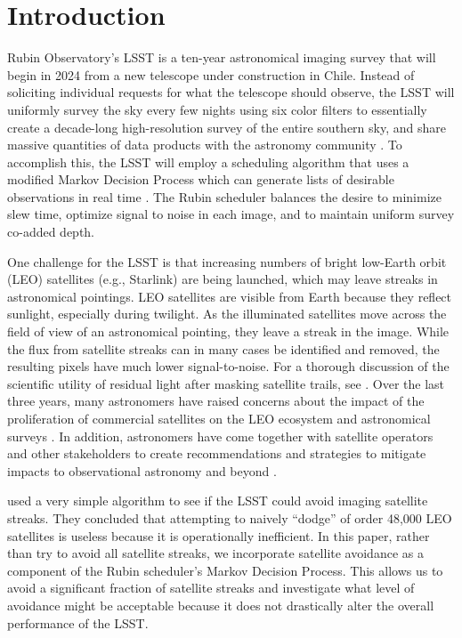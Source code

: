 \documentclass[twocolumn]{aastex631}
\begin{document}
\section{Introduction} \label{sec:intro}

Rubin Observatory's LSST is a ten-year astronomical imaging survey that will begin in 2024 from a new telescope under construction in Chile. Instead of soliciting individual requests for what the telescope should observe, the LSST will uniformly survey the sky every few nights using six color filters to essentially create a decade-long high-resolution survey of the entire southern sky, and share massive quantities of data products with the astronomy community \citep{overview}. To accomplish this, the LSST will employ a scheduling algorithm that uses a modified Markov Decision Process which can generate lists of desirable observations in real time \citep{naghib19}. The Rubin scheduler balances the desire to minimize slew time, optimize signal to noise in each image, and to maintain uniform survey co-added depth.

One challenge for the LSST is that increasing numbers of bright low-Earth orbit (LEO) satellites (e.g., Starlink) are being launched, which may leave streaks in astronomical pointings. LEO satellites are visible from Earth because they reflect sunlight, especially during twilight. As the illuminated satellites move across the field of view of an astronomical pointing, they leave a streak in the image. While the flux from satellite streaks can in many cases be identified and removed, the resulting pixels have much lower signal-to-noise. For a thorough discussion of the scientific utility of residual light after masking satellite trails, see \citet{hasan22}. Over the last three years, many astronomers have raised concerns about the impact of the proliferation of commercial satellites on the LEO ecosystem and astronomical surveys \citep{lawrence22,tyson20}. In addition, astronomers have come together with satellite operators and other stakeholders to create recommendations and strategies to mitigate impacts to observational astronomy and beyond \citep{satcon1,satcon2,dqs1,dqs2}.

\citet{tyson20} used a very simple algorithm to see if the LSST could avoid imaging satellite streaks. They concluded that attempting to naively ``dodge'' of order 48,000 LEO satellites is useless because it is operationally inefficient.
In this paper, rather than try to avoid all satellite streaks, we incorporate satellite avoidance as a component of the Rubin scheduler's Markov Decision Process. This allows us to avoid a significant fraction of satellite streaks and investigate what level of avoidance might be acceptable because it does not drastically alter the overall performance of the LSST.
\end{document}
